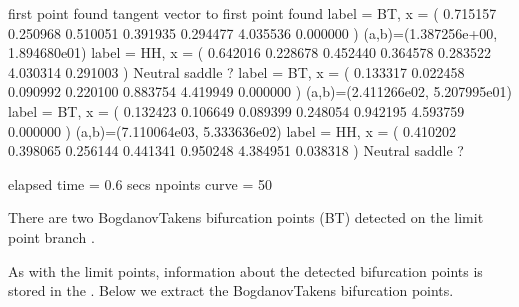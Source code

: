 \documentclass[letterpaper,10pt,english]{jupyterBook}
\begin{document}
\begin{sphinxVerbatim}[commandchars=\\\{\}]
\PYG{p}{[}\PYG{p}{]}
\end{sphinxVerbatim}

\begin{sphinxVerbatim}[commandchars=\\\{\}]
first point found
tangent vector to first point found
label = BT, x = ( \PYGZhy{}0.715157 \PYGZhy{}0.250968 0.510051 \PYGZhy{}0.391935 0.294477 4.035536 0.000000 )
(a,b)=(1.387256e+00, \PYGZhy{}1.894680e\PYGZhy{}01)
label = HH, x = ( \PYGZhy{}0.642016 \PYGZhy{}0.228678 0.452440 \PYGZhy{}0.364578 0.283522 4.030314 \PYGZhy{}0.291003 )
Neutral saddle ?
label = BT, x = ( \PYGZhy{}0.133317 0.022458 0.090992 \PYGZhy{}0.220100 0.883754 4.419949 0.000000 )
(a,b)=(\PYGZhy{}2.411266e\PYGZhy{}02, \PYGZhy{}5.207995e\PYGZhy{}01)
label = BT, x = ( \PYGZhy{}0.132423 0.106649 0.089399 \PYGZhy{}0.248054 0.942195 4.593759 \PYGZhy{}0.000000 )
(a,b)=(\PYGZhy{}7.110064e\PYGZhy{}03, 5.333636e\PYGZhy{}02)
label = HH, x = ( \PYGZhy{}0.410202 0.398065 0.256144 \PYGZhy{}0.441341 0.950248 4.384951 \PYGZhy{}0.038318 )
Neutral saddle ?

elapsed time  = 0.6 secs
npoints curve = 50
\end{sphinxVerbatim}

\sphinxAtStartPar
There are two Bogdanov\sphinxhyphen{}Takens bifurcation points (BT) detected on the limit
point branch .

\sphinxAtStartPar
As with the limit points, information about the detected bifurcation points is
stored in the  . Below we extract the
Bogdanov\sphinxhyphen{}Takens bifurcation points.
\end{document}
